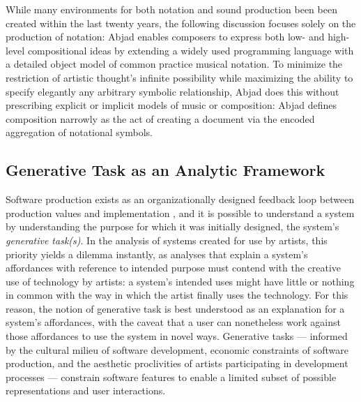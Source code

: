 \documentclass{article}
\begin{document}
While many environments for both notation and sound production been been
created within the last twenty years, the following discussion focuses solely
on the production of notation: Abjad enables composers to express both low- and
high-level compositional ideas by extending a widely used programming language
with a detailed object model of common practice musical notation. To minimize
the restriction of artistic thought's infinite possibility while maximizing the
ability to specify elegantly any arbitrary symbolic relationship, Abjad does
this without prescribing explicit or implicit models of music or composition:
Abjad defines composition narrowly as the act of creating a document via the
encoded aggregation of notational symbols.

\subsection{Generative Task as an Analytic Framework}

Software production exists as an organizationally designed feedback loop
between production values and implementation \cite{Derniame:1999fk}, and it is
possible to understand a system by understanding the purpose for which it was
initially designed, the system's \emph{generative task(s)}. In the analysis of
systems created for use by artists, this priority yields a dilemma instantly,
as analyses that explain a system's affordances with reference to intended
purpose must contend with the creative use of technology by artists: a system's
intended uses might have little or nothing in common with the way in which the
artist finally uses the technology. For this reason, the notion of generative
task is best understood as an explanation for a system's affordances, with the
caveat that a user can nonetheless work against those affordances to use the
system in novel ways. Generative tasks --- informed by the cultural milieu of
software development, economic constraints of software production, and the
aesthetic proclivities of artists participating in development processes ---
constrain software features to enable a limited subset of possible
representations and user interactions.
\end{document}
